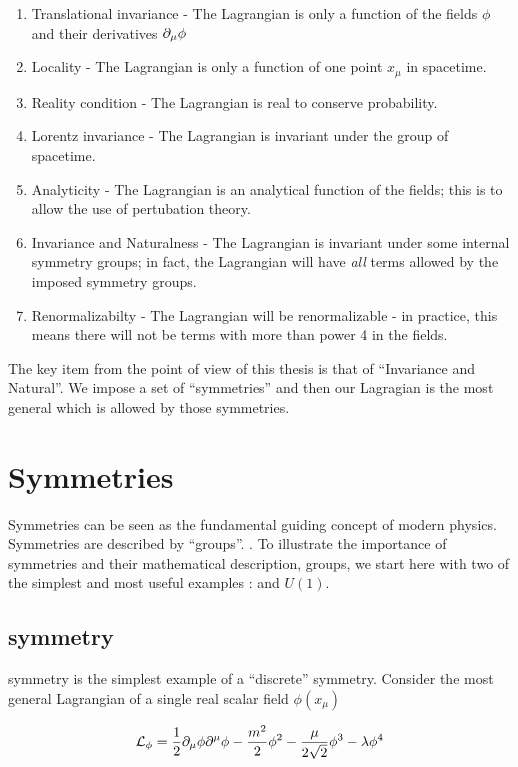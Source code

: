 \begin{enumerate}
\item Translational invariance - The Lagrangian is only a function of the fields $\phi$ and their derivatives $\partial_\mu \phi$
\item Locality - The Lagrangian is only a function of one point $x_\mu$ in spacetime.
\item Reality condition - The Lagrangian is real to conserve probability.
\item Lorentz invariance - The Lagrangian is invariant under the \Poincare group of spacetime.
\item Analyticity - The Lagrangian is an analytical function of the fields; this is to allow the use of pertubation theory.
\item Invariance and Naturalness - The Lagrangian is invariant under some internal symmetry groups; in fact, the Lagrangian will have \textit{all} terms allowed by the imposed symmetry groups. 
\item Renormalizabilty - The Lagrangian will be renormalizable - in practice, this means there will not be terms with more than power 4 in the fields.
\end{enumerate}

The key item from the point of view of this thesis is that of ``Invariance and Natural''.
We impose a set of ``symmetries'' and then our Lagragian is the most general which is allowed by those symmetries.

\section{Symmetries}

Symmetries can be seen as the fundamental guiding concept of modern physics.
Symmetries are described by ``groups''. .
To illustrate the importance of symmetries and their mathematical description, groups, we start here with two of the simplest and most useful examples :  \Ztwo and $U(1)$.

\subsection{\Ztwo symmetry}

\Ztwo symmetry is the simplest example of a ``discrete'' symmetry.
Consider the most general Lagrangian of a single real scalar field $\phi(x_\mu)$

\begin{equation} \label{scalarFieldLagrangian}
\mathcal{L}_\phi = \frac{1}{2} \partial_\mu \phi \partial^\mu \phi - \frac{m^2}{2} \phi^2 - \frac{\mu}{2 \sqrt{2}}  \phi^3 - \lambda \phi^4
\end{equation}

